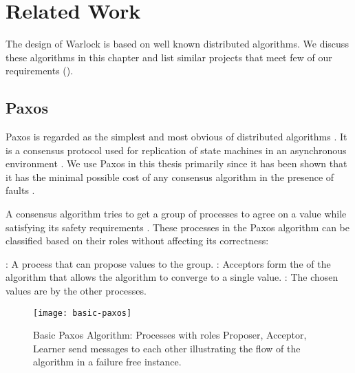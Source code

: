 \chapter{Related Work}
\label{chapter:related.work}

The design of Warlock is based on well known distributed algorithms. We discuss
these algorithms in this chapter and list similar projects that meet few of our
requirements ().

\section{Paxos}
\label{section:paxos}

Paxos is regarded as the simplest and most obvious of distributed algorithms
\citep{Lamport01}. It is a consensus protocol used for replication of state
machines in an asynchronous environment \citep{Lamport98}. We use Paxos in this
thesis primarily since it has been shown that it has the minimal possible cost
of any consensus algorithm in the presence of faults \citep{KeidarR03}.

A consensus algorithm tries to get a group of processes to agree on a value
while satisfying its safety requirements%
.
These processes in the Paxos algorithm can be classified based on their roles
without affecting its correctness:

\begin{itemize}
  : A process that can propose values to the group.
  : Acceptors form the  of the algorithm that allows
  the algorithm to converge to a single value.
  : The chosen values are  by the other processes.
\end{itemize}

\begin{figure}
  \texttt{[image: basic-paxos]}
      \caption[Basic Paxos]{%
        Basic Paxos Algorithm: Processes with roles \dash{} Proposer, Acceptor,
        Learner \dash{} send messages to each other illustrating the flow of the
        algorithm in a failure free instance.}
      \label{figure:basic_paxos}
  \normalcaption
\end{figure}

